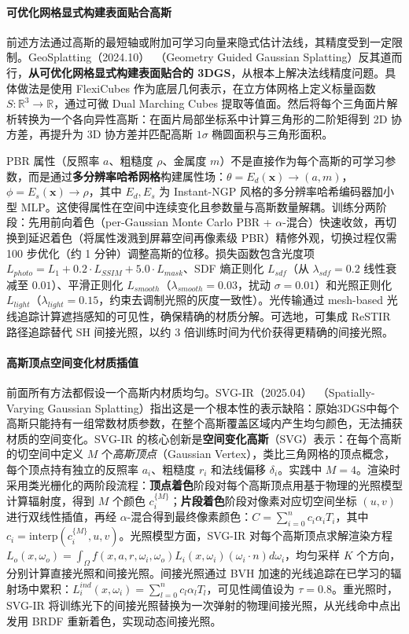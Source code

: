 \paragraph{可优化网格显式构建表面贴合高斯}

前述方法通过高斯的最短轴或附加可学习向量来隐式估计法线，其精度受到一定限制。GeoSplatting（2024.10）~\cite{2410_24204}（Geometry Guided Gaussian Splatting）反其道而行，\textbf{从可优化网格显式构建表面贴合的 3DGS}，从根本上解决法线精度问题。具体做法是使用 FlexiCubes 作为底层几何表示，在立方体网格上定义标量函数 $S: \mathbb{R}^3 \to \mathbb{R}$，通过可微 Dual Marching Cubes 提取等值面。然后将每个三角面片解析转换为一个各向异性高斯：在面片局部坐标系中计算三角形的二阶矩得到 2D 协方差，再提升为 3D 协方差并匹配高斯 $1\sigma$ 椭圆面积与三角形面积。

PBR 属性（反照率 $a$、粗糙度 $\rho$、金属度 $m$）不是直接作为每个高斯的可学习参数，而是通过\textbf{多分辨率哈希网格}构建属性场：$\theta = E_d(\mathbf{x}) \to (a, m)$，$\phi = E_s(\mathbf{x}) \to \rho$，其中 $E_d, E_s$ 为 Instant-NGP 风格的多分辨率哈希编码器加小型 MLP。这使得属性在空间中连续变化且参数量与高斯数量解耦。训练分两阶段：先用前向着色（per-Gaussian Monte Carlo PBR + $\alpha$-混合）快速收敛，再切换到延迟着色（将属性泼溅到屏幕空间再像素级 PBR）精修外观，切换过程仅需 100 步优化（约 1 分钟）调整高斯的位移。损失函数包含光度项 $L_{photo} = L_1 + 0.2 \cdot L_{SSIM} + 5.0 \cdot L_{mask}$、SDF 熵正则化 $L_{sdf}$（从 $\lambda_{sdf} = 0.2$ 线性衰减至 $0.01$）、平滑正则化 $L_{smooth}$（$\lambda_{smooth} = 0.03$，扰动 $\sigma = 0.01$）和光照正则化 $L_{light}$（$\lambda_{light} = 0.15$，约束去调制光照的灰度一致性）。光传输通过 mesh-based 光线追踪计算遮挡感知的可见性，确保精确的材质分解。可选地，可集成 ReSTIR 路径追踪替代 SH 间接光照，以约 3 倍训练时间为代价获得更精确的间接光照。

\paragraph{高斯顶点空间变化材质插值}

前面所有方法都假设一个高斯内材质均匀。SVG-IR（2025.04）~\cite{2504_06815}（Spatially-Varying Gaussian Splatting）指出这是一个根本性的表示缺陷：原始3DGS中每个高斯只能持有一组常数材质参数，在整个高斯覆盖区域内产生均匀颜色，无法捕获材质的空间变化。SVG-IR 的核心创新是\textbf{空间变化高斯}（SVG）表示：在每个高斯的切空间中定义 $M$ 个\emph{高斯顶点}（Gaussian Vertex），类比三角网格的顶点概念，每个顶点持有独立的反照率 $a_i$、粗糙度 $r_i$ 和法线偏移 $\delta_i$。实践中 $M=4$。渲染时采用类光栅化的两阶段流程：\textbf{顶点着色}阶段对每个高斯顶点用基于物理的光照模型计算辐射度，得到 $M$ 个颜色 $c_i^{\{M\}}$；\textbf{片段着色}阶段对像素对应切空间坐标 $(u,v)$ 进行双线性插值，再经 $\alpha$-混合得到最终像素颜色：$C = \sum_{i=0}^n c_i \alpha_i T_i$，其中 $c_i = \text{interp}(c_i^{\{M\}}, u, v)$。光照模型方面，SVG-IR 对每个高斯顶点求解渲染方程 $L_o(x, \omega_o) = \int_{\Omega} f(x, a, r, \omega_i, \omega_o) L_i(x, \omega_i)(\omega_i \cdot n) d\omega_i$，均匀采样 $K$ 个方向，分别计算直接光照和间接光照。间接光照通过 BVH 加速的光线追踪在已学习的辐射场中累积：$L_i^{ind}(x, \omega_i) = \sum_{l=0}^n c_l \alpha_l T_l$，可见性阈值设为 $\tau=0.8$。重光照时，SVG-IR 将训练光下的间接光照替换为一次弹射的物理间接光照，从光线命中点出发用 BRDF 重新着色，实现动态间接光照。

